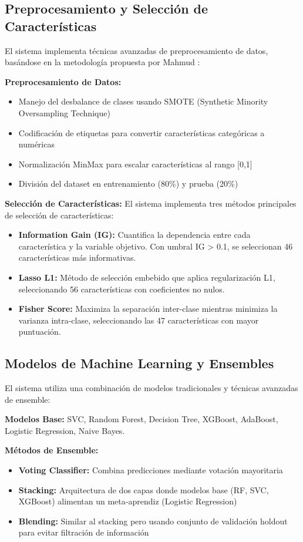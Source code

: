 \documentclass[conference]{IEEEtran}
\begin{document}
\subsection{Preprocesamiento y Selección de Características}
El sistema implementa técnicas avanzadas de preprocesamiento de datos, basándose en la metodología propuesta por Mahmud \cite{mahmud2025trustworthy}:

\textbf{Preprocesamiento de Datos:}
\begin{itemize}
    \item Manejo del desbalance de clases usando SMOTE (Synthetic Minority Oversampling Technique)
    \item Codificación de etiquetas para convertir características categóricas a numéricas
    \item Normalización MinMax para escalar características al rango [0,1]
    \item División del dataset en entrenamiento (80\%) y prueba (20\%)
\end{itemize}

\textbf{Selección de Características:}
El sistema implementa tres métodos principales de selección de características:
\begin{itemize}
    \item \textbf{Information Gain (IG):} Cuantifica la dependencia entre cada característica y la variable objetivo. Con umbral IG > 0.1, se seleccionan 46 características más informativas.
    \item \textbf{Lasso L1:} Método de selección embebido que aplica regularización L1, seleccionando 56 características con coeficientes no nulos.
    \item \textbf{Fisher Score:} Maximiza la separación inter-clase mientras minimiza la varianza intra-clase, seleccionando las 47 características con mayor puntuación.
\end{itemize}

\subsection{Modelos de Machine Learning y Ensembles}
El sistema utiliza una combinación de modelos tradicionales y técnicas avanzadas de ensemble:

\textbf{Modelos Base:} SVC, Random Forest, Decision Tree, XGBoost, AdaBoost, Logistic Regression, Naive Bayes.

\textbf{Métodos de Ensemble:}
\begin{itemize}
    \item \textbf{Voting Classifier:} Combina predicciones mediante votación mayoritaria
    \item \textbf{Stacking:} Arquitectura de dos capas donde modelos base (RF, SVC, XGBoost) alimentan un meta-aprendiz (Logistic Regression)
    \item \textbf{Blending:} Similar al stacking pero usando conjunto de validación holdout para evitar filtración de información
\end{itemize}
\end{document}
